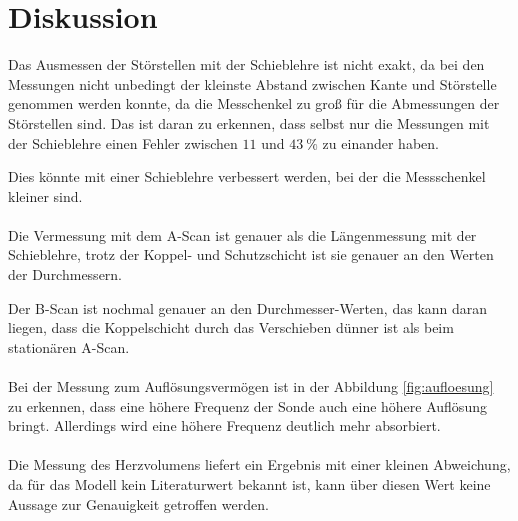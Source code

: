 \section{Diskussion}
\label{sec:Diskussion}

Das Ausmessen der Störstellen mit der Schieblehre ist nicht exakt, da bei den
Messungen nicht unbedingt der kleinste Abstand zwischen Kante und Störstelle
genommen werden konnte, da die Messchenkel zu groß für die Abmessungen der
Störstellen sind. Das ist daran zu erkennen, dass selbst nur die Messungen mit
der Schieblehre einen Fehler zwischen $\num{11}$ und $\SI{43}{\percent}$ zu
einander haben.

Dies könnte mit einer Schieblehre verbessert werden, bei der die Messschenkel
kleiner sind.
\\~\\
Die Vermessung mit dem A-Scan ist genauer als die Längenmessung mit der Schieblehre,
trotz der Koppel- und Schutzschicht ist sie genauer an den Werten der Durchmessern.

Der B-Scan ist nochmal genauer an den Durchmesser-Werten, das kann daran liegen,
dass die Koppelschicht durch das Verschieben dünner ist als beim stationären A-Scan.
\\~\\
Bei der Messung zum Auflösungsvermögen ist in der Abbildung \ref{fig:aufloesung}
zu erkennen, dass eine höhere Frequenz der Sonde auch eine höhere Auflösung bringt.
Allerdings wird eine höhere Frequenz deutlich mehr absorbiert.
\\~\\
Die Messung des Herzvolumens liefert ein Ergebnis mit einer kleinen Abweichung,
da für das Modell kein Literaturwert bekannt ist, kann über diesen Wert keine
Aussage zur Genauigkeit getroffen werden.
